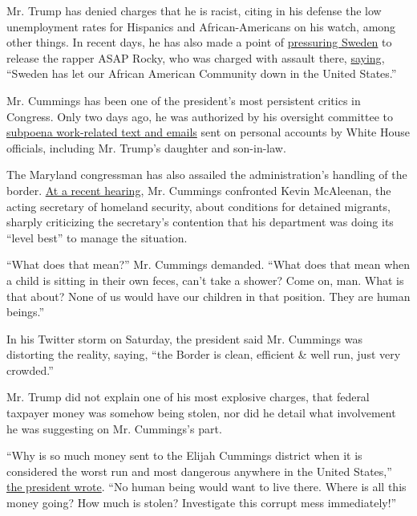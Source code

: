 Mr. Trump has denied charges that he is racist, citing in his defense
the low unemployment rates for Hispanics and African-Americans on his
watch, among other things. In recent days, he has also made a point of
\href{https://www.nytimes3xbfgragh.onion/2019/07/25/arts/music/asap-rocky-charged-sweden.html}{pressuring
Sweden} to release the rapper ASAP Rocky, who was charged with assault
there,
\href{https://twitter.com/realDonaldTrump/status/1154501344323080192}{saying},
``Sweden has let our African American Community down in the United
States.''

Mr. Cummings has been one of the president's most persistent critics in
Congress. Only two days ago, he was authorized by his oversight
committee to
\href{https://www.nytimes3xbfgragh.onion/2019/07/25/us/politics/personal-emails-white-house-ivanka.html}{subpoena
work-related text and emails} sent on personal accounts by White House
officials, including Mr. Trump's daughter and son-in-law.

The Maryland congressman has also assailed the administration's handling
of the border.
\href{https://www.npr.org/2019/07/18/742323488/homeland-security-chief-to-face-off-with-democrats-on-border-crisis}{At
a recent hearing}, Mr. Cummings confronted Kevin McAleenan, the acting
secretary of homeland security, about conditions for detained migrants,
sharply criticizing the secretary's contention that his department was
doing its ``level best'' to manage the situation.

``What does that mean?'' Mr. Cummings demanded. ``What does that mean
when a child is sitting in their own feces, can't take a shower? Come
on, man. What is that about? None of us would have our children in that
position. They are human beings.''

In his Twitter storm on Saturday, the president said Mr. Cummings was
distorting the reality, saying, ``the Border is clean, efficient \& well
run, just very crowded.''

Mr. Trump did not explain one of his most explosive charges, that
federal taxpayer money was somehow being stolen, nor did he detail what
involvement he was suggesting on Mr. Cummings's part.

``Why is so much money sent to the Elijah Cummings district when it is
considered the worst run and most dangerous anywhere in the United
States,''
\href{https://twitter.com/realDonaldTrump/status/1155073965880172544}{the
president wrote}. ``No human being would want to live there. Where is
all this money going? How much is stolen? Investigate this corrupt mess
immediately!''

